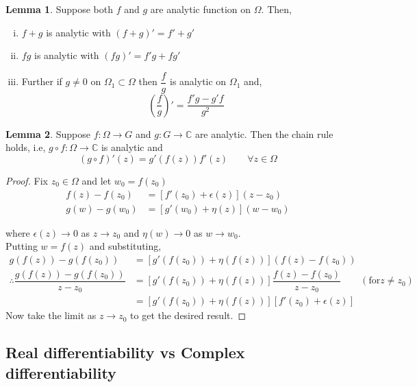 \documentclass[12pt]{article}
\newcommand{\C}{\mathbb{C}}
\theoremstyle{definition}
\newtheorem{lem}{Lemma}
\newenvironment{lemma}{
\begin{tcolorbox}[colback=green!5!white,colframe=green!75!black, parbox = false]\begin{lem} }{\end{lem}\end{tcolorbox} }
\begin{document}
\begin{lemma}
Suppose both $f$ and $g$ are analytic function on $\Omega$. Then,
\begin{enumerate}[(i)]
    \item $f+g$ is analytic with $(f+g)'=f'+g'$
    \item $fg$ is analytic with $(fg)'=f'g+fg'$
    \item Further if $g\neq0$ on $\Omega_1\subset \Omega$ then $\dfrac{f}{g}$ is analytic on $\Omega_1$ and,
    \begin{equation*}
        \left(\dfrac{f}{g}\right)'=\dfrac{f'g-g'f}{g^2}
    \end{equation*}
\end{enumerate}
\end{lemma}


\begin{lemma}
Suppose $f:\Omega\to G$ and $g:G\to \C$ are analytic. Then the chain rule holds, i.e, $g\circ f:\Omega\to \C$ is analytic and
\begin{equation*}
    (g\circ f)'(z)=g'(f(z))f'(z)\qquad \forall z\in \Omega
\end{equation*}
\end{lemma}


\begin{proof}
Fix $z_0\in \Omega$ and let $w_0=f(z_0)$\\
\begin{align*}
    f(z)-f(z_0)&=[f'(z_0)+\epsilon(z)](z-z_0)\\
    g(w)-g(w_0)&=[g'(w_0)+\eta(z)](w-w_0)
\end{align*}

where $\epsilon(z)\to 0$ as $z\to z_0$ and $\eta(w)\to 0$ as $w\to w_0$.\\
Putting $w=f(z)$ and substituting,
\begin{align*}
    g(f(z))-g(f(z_0))&=[g'(f(z_0))+\eta(f(z))](f(z)-f(z_0))\\
    \therefore \dfrac{g(f(z))-g(f(z_0))}{z-z_0}&=[g'(f(z_0))+\eta(f(z))]\dfrac{f(z)-f(z_0)}{z-z_0}\qquad(\text{for}z\neq z_0)\\
    &=[g'(f(z_0))+\eta(f(z))][f'(z_0)+\epsilon(z)]
\end{align*}
Now take the limit as $z\to z_0$ to get the desired result.
\end{proof}


\subsection{Real differentiability vs Complex differentiability}
\end{document}
